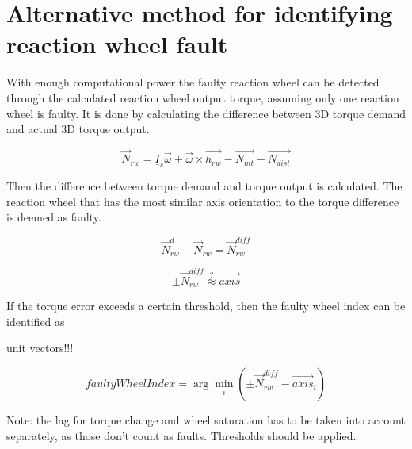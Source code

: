 \chapter{Alternative method for identifying reaction wheel fault} \label{chap:E}

With enough computational power the faulty reaction wheel can be detected through the calculated reaction wheel output torque, assuming only one reaction wheel is faulty. It is done by calculating the difference between 3D torque demand and actual 3D torque output. 

\begin{equation}
\vec{N}_{rw} = \underline{I}_s \dot{\vec{\omega}}  + \vec{\omega} \times \vec{h_{rw}} - \vec{N_{mt}} - \vec{N_{dist}}
\end{equation}

Then the difference between torque demand and torque output is calculated. The reaction wheel that has the most similar axis orientation to the torque difference is deemed as faulty.

\begin{equation}
\vec{N}_{rw}^{d} - \vec{N}_{rw} = 
\vec{N}_{rw}^{diff}
\end{equation}

\begin{equation}
 \pm \vec{N}_{rw}^{diff}  \stackrel{?}{\approx} \vec{axis} 
\end{equation}

If the torque error exceeds a certain threshold, then the faulty wheel index can be identified as

unit vectors!!!

\begin{equation}
faultyWheelIndex = \arg\min_i ( \pm \vec{N}_{rw}^{diff} - \vec{axis}_i ) 
\end{equation}


Note: the lag for torque change and wheel saturation has to be taken into account separately, as those don't count as faults. 
Thresholds should be applied.